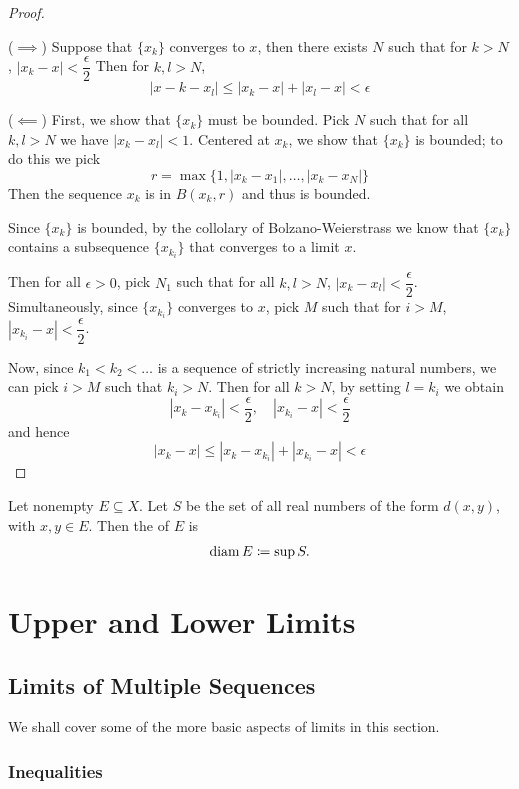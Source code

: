 \begin{proof} \

($\implies$) Suppose that $\{x_k\}$ converges to $x$, then there exists $N$ such that for $k>N$, $|x_k-x|<\dfrac{\epsilon}{2}$
Then for $k,l>N$, 
\[ |x-k-x_l| \le |x_k-x|+|x_l-x| < \epsilon \]

($\impliedby$) First, we show that $\{x_k\}$ must be bounded. 
Pick $N$ such that for all $k,l>N$ we have $|x_k-x_l|<1$. 
Centered at $x_k$, we show that $\{x_k\}$ is bounded; to do this we pick
\[ r = \max\{1,|x_k-x_1|,\dots,|x_k-x_N|\} \]
Then the sequence ${x_k}$ is in $B(x_k,r)$ and thus is bounded.

Since $\{x_k\}$ is bounded, by the collolary of Bolzano-Weierstrass we know that $\{x_k\}$ contains a subsequence $\{x_{k_i}\}$ that converges to a limit $x$.

Then for all $\epsilon>0$, pick $N_1$ such that for all $k,l>N$, $|x_k-x_l|<\dfrac{\epsilon}{2}$. 
Simultaneously, since $\{x_{k_i}\}$ converges to $x$, pick $M$ such that for $i>M$, $|x_{k_i}-x|<\dfrac{\epsilon}{2}$.

Now, since $k_1<k_2<\dots$ is a sequence of strictly increasing natural numbers, we can pick $i>M$ such that $k_i>N$. Then for all $k>N$, by setting $l=k_i$ we obtain
\[ |x_k-x_{k_i}| < \frac{\epsilon}{2}, \quad |x_{k_i}-x| < \frac{\epsilon}{2} \]
and hence
\[ |x_k-x| \le |x_k-x_{k_i}|+|x_{k_i}-x| < \epsilon \]
\end{proof}

\begin{definition}
Let nonempty $E\subseteq X$. Let $S$ be the set of all real numbers of the form $d(x,y)$, with $x,y\in E$. Then the  of $E$ is 
\[ \operatorname{diam} E\coloneqq\sup S. \]

\end{definition}
\pagebreak

\section{Upper and Lower Limits}


\subsection{Limits of Multiple Sequences}
We shall cover some of the more basic aspects of limits in this section.

\subsubsection{Inequalities}

